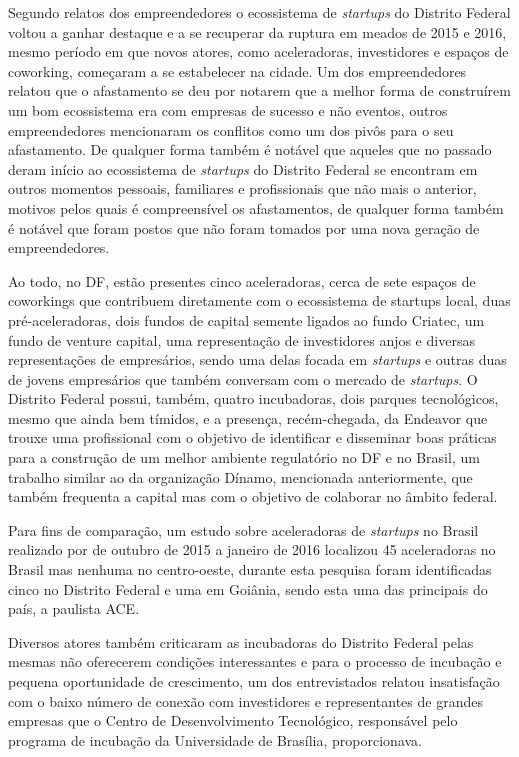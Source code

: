 Segundo relatos dos empreendedores o ecossistema de \textit{startups} do Distrito Federal voltou a ganhar destaque e a se recuperar da ruptura em meados de 2015 e 2016, mesmo período em que novos atores, como aceleradoras, investidores e espaços de coworking, começaram a se estabelecer na cidade. Um dos empreendedores relatou que o afastamento se deu por notarem que a melhor forma de construírem um bom ecossistema era com empresas de sucesso e não eventos, outros empreendedores mencionaram os conflitos como um dos pivôs para o seu afastamento. De qualquer forma também é notável que aqueles que no passado deram início ao ecossistema de \textit{startups} do Distrito Federal se encontram em outros momentos pessoais, familiares e profissionais que não mais o anterior, motivos pelos quais é compreensível os afastamentos, de qualquer forma também é notável que foram postos que não foram tomados por uma nova geração de empreendedores.

Ao todo, no DF, estão presentes cinco aceleradoras, cerca de sete espaços de coworkings que contribuem diretamente com o ecossistema de startups local, duas pré-aceleradoras, dois fundos de capital semente ligados ao fundo Criatec, um fundo de venture capital, uma representação de investidores anjos e diversas representações de empresários, sendo uma delas focada em \textit{startups} e outras duas de jovens empresários que também conversam com o mercado de \textit{startups}. O Distrito Federal possui, também, quatro incubadoras, dois parques tecnológicos, mesmo que ainda bem tímidos, e a presença, recém-chegada, da Endeavor que trouxe uma profissional com o objetivo de identificar e disseminar boas práticas para a construção de um melhor ambiente regulatório no DF e no Brasil, um trabalho similar ao da organização Dínamo, mencionada anteriormente, que também frequenta a capital mas com o objetivo de colaborar no âmbito federal.

Para fins de comparação, um estudo sobre aceleradoras de \textit{startups} no Brasil realizado por  de outubro de 2015 a janeiro de 2016 localizou 45 aceleradoras no Brasil mas nenhuma no centro-oeste, durante esta pesquisa foram identificadas cinco no Distrito Federal e uma em Goiânia, sendo esta uma das principais do país, a paulista ACE.

Diversos atores também criticaram as incubadoras do Distrito Federal pelas mesmas não oferecerem condições interessantes e para o processo de incubação e pequena oportunidade de crescimento, um dos entrevistados relatou insatisfação com o baixo número de conexão com investidores e representantes de grandes empresas que o Centro de Desenvolvimento Tecnológico, responsável pelo programa de incubação da Universidade de Brasília, proporcionava.

